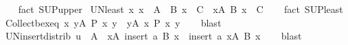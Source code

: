 \begin{isabellebody}
%
\isadelimproof
\ \ %
\endisadelimproof
%
\isatagproof
{}\isamarkupfalse%
\ {\isacharparenleft}{\kern0pt}fact\ SUP{\isacharunderscore}{\kern0pt}upper{\isacharparenright}{\kern0pt}%
\endisatagproof
{\isafoldproof}%
%
\isadelimproof
\isanewline
%
\endisadelimproof
\isanewline
{}\isamarkupfalse%
\ UN{\isacharunderscore}{\kern0pt}least{\isacharcolon}{\kern0pt}\ {\isachardoublequoteopen}{\isacharparenleft}{\kern0pt}{\isasymAnd}x{\isachardot}{\kern0pt}\ x\ {\isasymin}\ A\ {\isasymLongrightarrow}\ B\ x\ {\isasymsubseteq}\ C{\isacharparenright}{\kern0pt}\ {\isasymLongrightarrow}\ {\isacharparenleft}{\kern0pt}{\isasymUnion}x{\isasymin}A{\isachardot}{\kern0pt}\ B\ x{\isacharparenright}{\kern0pt}\ {\isasymsubseteq}\ C{\isachardoublequoteclose}\isanewline
%
\isadelimproof
\ \ %
\endisadelimproof
%
\isatagproof
{}\isamarkupfalse%
\ {\isacharparenleft}{\kern0pt}fact\ SUP{\isacharunderscore}{\kern0pt}least{\isacharparenright}{\kern0pt}%
\endisatagproof
{\isafoldproof}%
%
\isadelimproof
\isanewline
%
\endisadelimproof
\isanewline
{}\isamarkupfalse%
\ Collect{\isacharunderscore}{\kern0pt}bex{\isacharunderscore}{\kern0pt}eq{\isacharcolon}{\kern0pt}\ {\isachardoublequoteopen}{\isacharbraceleft}{\kern0pt}x{\isachardot}{\kern0pt}\ {\isasymexists}y{\isasymin}A{\isachardot}{\kern0pt}\ P\ x\ y{\isacharbraceright}{\kern0pt}\ {\isacharequal}{\kern0pt}\ {\isacharparenleft}{\kern0pt}{\isasymUnion}y{\isasymin}A{\isachardot}{\kern0pt}\ {\isacharbraceleft}{\kern0pt}x{\isachardot}{\kern0pt}\ P\ x\ y{\isacharbraceright}{\kern0pt}{\isacharparenright}{\kern0pt}{\isachardoublequoteclose}\isanewline
%
\isadelimproof
\ \ %
\endisadelimproof
%
\isatagproof
{}\isamarkupfalse%
\ blast%
\endisatagproof
{\isafoldproof}%
%
\isadelimproof
\isanewline
%
\endisadelimproof
\isanewline
{}\isamarkupfalse%
\ UN{\isacharunderscore}{\kern0pt}insert{\isacharunderscore}{\kern0pt}distrib{\isacharcolon}{\kern0pt}\ {\isachardoublequoteopen}u\ {\isasymin}\ A\ {\isasymLongrightarrow}\ {\isacharparenleft}{\kern0pt}{\isasymUnion}x{\isasymin}A{\isachardot}{\kern0pt}\ insert\ a\ {\isacharparenleft}{\kern0pt}B\ x{\isacharparenright}{\kern0pt}{\isacharparenright}{\kern0pt}\ {\isacharequal}{\kern0pt}\ insert\ a\ {\isacharparenleft}{\kern0pt}{\isasymUnion}x{\isasymin}A{\isachardot}{\kern0pt}\ B\ x{\isacharparenright}{\kern0pt}{\isachardoublequoteclose}\isanewline
%
\isadelimproof
\ \ %
\endisadelimproof
%
\isatagproof
{}\isamarkupfalse%
\ blast%
\endisatagproof
{\isafoldproof}%
%
\isadelimproof
\isanewline
%
\endisadelimproof

\end{isabellebody}
